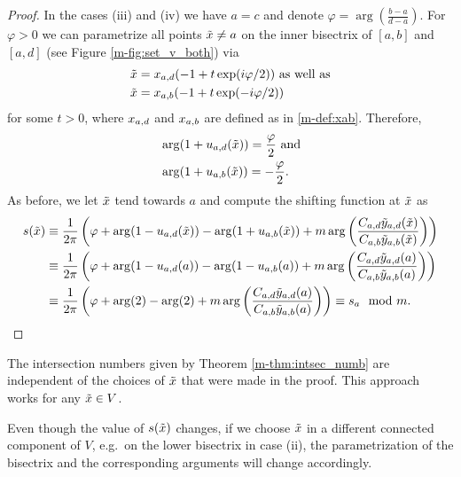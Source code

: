 \documentclass[main.tex]{subfiles}
\begin{document}
\begin{proof}
  In the cases (iii) and (iv) we have $a = c$ and denote $\varphi =  \arg \left( \frac{b-a}{d-a} \right)$. For $\varphi > 0$ we can parametrize all points $\tilde{x} \ne a$ on the inner
  bisectrix of $[a,b]$ and $[a,d]$ (see Figure \ref{m-fig:set_v_both}) via
 \begin{align*}
  \tilde{x} & = x_{a,d}(-1+t \exp(i \varphi /2)) \text{  as well as} \\
  \tilde{x} & = x_{a,b}(-1+t \exp(-i \varphi/2))
 \end{align*}
 for some $t > 0$, where $x_{a,d}$ and $x_{a,b}$ are defined as in \eqref{m-def:xab}. Therefore,
 \begin{align*}
   & \arg (1+u_{a,d}(\tilde{x})) = \frac{\varphi}{2} \text{ and} \\
   & \arg (1+u_{a,b}(\tilde{x})) = -\frac{\varphi}{2}.
 \end{align*}
 As before, we let $\tilde{x}$ tend towards $a$ and compute the shifting function at $\tilde{x}$ as
 \begin{align*}
  s(\tilde{x}) & \equiv \frac{1}{2\pi} \left( \varphi + \arg(1-u_{a,d}(\tilde{x})) - \arg(1+u_{a,b}(\tilde{x})) +  m \arg \left( \frac{ C_{a,d} \tilde{y}_{a,d}(\tilde{x})}{C_{a,b}\tilde{y}_{a,b}(\tilde{x})} \right)\right) \\
	 & \equiv \frac{1}{2\pi} \left ( \varphi +\arg(1-u_{a,d}(a)) - \arg(1-u_{a,b}(a)) +  m \arg \left( \frac{ C_{a,d} \tilde{y}_{a,d}(a)}{C_{a,b}\tilde{y}_{a,b}(a)} \right)\right) \\
	 & \equiv \frac{1}{2\pi} \left( \varphi +\arg(2) - \arg(2) +  m \arg \left( \frac{ C_{a,d} \tilde{y}_{a,d}(a)}{C_{a,b}\tilde{y}_{a,b}(a)} \right)\right) \equiv s_a \mod m.
 \end{align*}
\end{proof}

\begin{rmk}
  The intersection numbers given by Theorem \ref{m-thm:intsec_numb} are independent of the choices of $\tilde{x}$ that were made in the proof. This approach works for any $\tilde{x} \in V$.

  Even though the value of
  $s(\tilde{x})$ changes, if we choose $\tilde{x}$ in a different connected component of $V$, e.g.\ on the lower bisectrix in case (ii),
  the parametrization of the bisectrix and the corresponding arguments will change accordingly.
\end{rmk}
\end{document}

